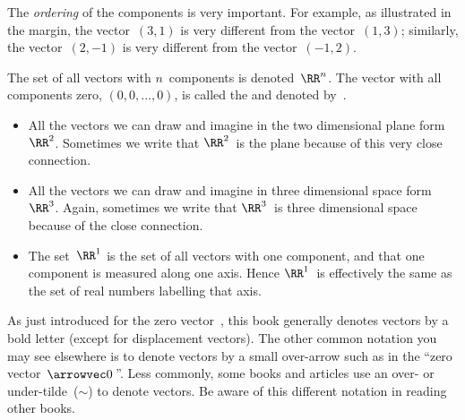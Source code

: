 The \emph{ordering} of the components is very important.
%
For example, as illustrated in the margin, the vector~\((3,1)\) is very different from the vector~\((1,3)\); similarly, the vector~\((2,-1)\) is very different from the vector~\((-1,2)\).
 


\begin{definition} \label{def:rRn}
The set of all vectors with \(n\)~components is denoted~\(\RR^n\).
The vector with all components zero,  \((0,0,\ldots,0)\), is called the  and denoted by~\ov.
\end{definition}

\begin{example} \label{eg:}
\begin{itemize}
\item All the vectors we can draw and imagine in the two dimensional plane form~\(\RR^2\).  
Sometimes we write that \(\RR^2\)~is the plane because of this very close connection.

\item All the vectors we can draw and imagine in three dimensional space form~\(\RR^3\).  
Again, sometimes we write that \(\RR^3\)~is three dimensional space because of the close connection. 

\item The set~\(\RR^1\) is the set of all vectors with one component, and that one component is measured along one axis.  
Hence \(\RR^1\)~is effectively the same as the set of real numbers labelling that axis.
\end{itemize}
\end{example}


As just introduced for the zero vector~\ov, this book generally denotes vectors by a bold letter (except for displacement vectors).
The other common notation you may see elsewhere is to denote vectors by a small over-arrow such as in the ``zero vector~\(\arrowvec0\)\,''.
Less commonly, some books and articles use an over- or under-tilde~(\(\sim\)) to denote vectors.
Be aware of this different notation in reading other books.



